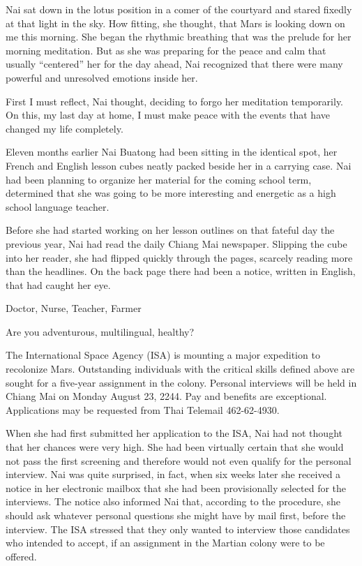 \documentclass[]{article}
\begin{document}
{Nai sat down in the lotus position in a comer of the courtyard and stared fixedly at that light in the sky.  How fitting, she thought, that Mars is looking down on me this morning.  She began the rhythmic breathing that was the prelude for her morning meditation.  But as she was preparing for the peace and calm that usually “centered” her for the day ahead, Nai recognized that there were many powerful and unresolved emotions inside her.

First I must reflect, Nai thought, deciding to forgo her meditation temporarily.  On this, my last day at home, I must make peace with the events that have changed my life completely.

Eleven months earlier Nai Buatong had been sitting in the identical spot, her French and English lesson cubes neatly packed beside her in a carrying case.  Nai had been planning to organize her material for the coming school term, determined that she was going to be more interesting and energetic as a high school language teacher.

Before she had started working on her lesson outlines on that fateful day the previous year, Nai had read the daily Chiang Mai newspaper.  Slipping the cube into her reader, she had flipped quickly through the pages, scarcely reading more than the headlines.  On the back page there had been a notice, written in English, that had caught her eye.

Doctor, Nurse, Teacher, Farmer

Are you adventurous, multilingual, healthy?

The International Space Agency (ISA) is mounting a major expedition to recolonize Mars.  Outstanding individuals with the critical skills defined above are sought for a five-year assignment in the colony.  Personal interviews will be held in Chiang Mai on Monday August 23, 2244.  Pay and benefits are exceptional.  Applications may be requested from Thai Telemail  462-62-4930.

When she had first submitted her application to the ISA, Nai had not thought that her chances were very high.  She had been virtually certain that she would not pass the first screening and therefore would not even qualify for the personal interview.  Nai was quite surprised, in fact, when six weeks later she received a notice in her electronic mailbox that she had been provisionally selected for the interviews.  The notice also informed Nai that, according to the procedure, she should ask whatever personal questions she might have by mail first, before the interview.  The ISA stressed that they only wanted to interview those candidates who intended to accept, if an assignment in the Martian colony were to be offered.

}
\end{document}
